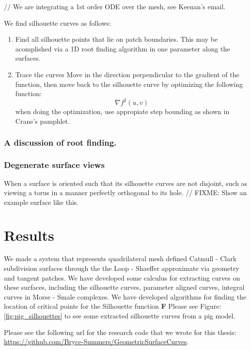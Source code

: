 \documentclass[12pt, letterpaper]{article}
\begin{document}
		// We are integrating a 1st order ODE over the mesh, see Keenan's email.

		We find silhouette curves as follows:

		\begin{enumerate}
		\item Find all silhouette points that lie on patch boundaries. This may be acomplished via a 1D root finding algorithm in one parameter along the surfaces.
		\item Trace the curves
			Move in the direction perpendicular to the gradient of the function, then move back to the silhouette curve by optimizing the following function:
		$$\nabla f^{2}(u, v)$$ when doing the optimization, use appropiate step bounding as shown in Crane's pamphlet.
		\end{enumerate}

		\subsubsection{A discussion of root finding.}


		\subsubsection{Degenerate surface views}

		When a surface is oriented such that its silhouette curves are not disjoint, such as viewing a torus in a manner perfectly orthogonal to its hole.
		// FIXME: Show an example surface like this.

\section{Results}

We made a system that represents quadrilateral mesh defined Catmull - Clark subdivision surfaces through the the Loop - Shaeffer approximate via geometry and tangent patches.
We have developed some calculus for extracting curves on these surfaces, including the silhouette curves, parameter aligned curves, integral curves in
Morse - Smale complexes.
We have developed algorithms for finding the location of critical points for the Silhouette function \textbf{F}
Please see Figure: \ref{fig:pig_silhouettes} to see some extracted silhouette curves from a pig model.

Please see the following url for the research code that we wrote for this thesis: \url{https://github.com/Bryce-Summers/GeometricSurfaceCurves}.
\end{document}
